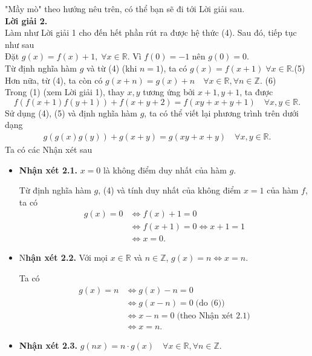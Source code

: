 \begin{bt}
{		"Mầy mò" theo hướng nêu trên, có thể bạn sẽ đi tới Lời giải sau.\\		
		\textbf{Lời giải 2.}\\
		Làm như Lời giải 1 cho đến hết phần rút ra được hệ thức (4). Sau đó, tiếp tục như sau\\
		Đặt $g(x)=f(x)+1, \; \forall x \in \mathbb{R}$. Vì $f(0)=-1$ nên $g(0)=0$.\\
		Từ định nghĩa hàm $g$ và từ (4) (khi $n=1$), ta có $g(x)=f(x+1)\;\forall x \in \mathbb{R}.$\hfill (5)\\
		Hơn nữa, từ (4), ta còn có $g(x+n)=g(x)+n \quad \forall x \in \mathbb{R},  \forall n \in \mathbb{Z}$. \hfill (6)\\
		Trong (1) (xem Lời giải 1), thay $x,y$ tương ứng bởi $x+1, y+1$, ta được
		$$f\left(f(x+1)f(y+1)\right)+f(x+y+2)=f(xy+x+y+1) \quad \forall x,y \in \mathbb{R}.$$
		Sử dụng (4), (5) và định nghĩa hàm $g$, ta có thể viết lại phương trình trên dưới dạng
		\begin{align*}
			g\left(g(x)g(y)\right)+g(x+y)=g(xy+x+y) \quad \forall x,y \in \mathbb{R}. \tag{7}
		\end{align*}
		Ta có các Nhận xét sau
		\begin{itemize}
			\item \textbf{Nhận xét 2.1.} $x=0$ là không điểm duy nhất của hàm $g$.
			\begin{cm}
				Từ định nghĩa hàm $g$, (4) và tính duy nhất của không điểm $x=1$ của hàm $f$, ta có
				\begin{align*}
					g(x)=0& \Leftrightarrow f(x)+1=0\\ 
					& \Leftrightarrow f(x+1)=0 \Leftrightarrow x+1=1\\
					&\Leftrightarrow x=0.
				\end{align*}
			\end{cm}
			\item N\textbf{hận xét 2.2.} Với mọi $x \in \mathbb{R}$ và $n \in \mathbb{Z}$, $g(x)=n \Leftrightarrow x=n$.
			\begin{cm}
				Ta có
				\begin{align*}
					g(x)=n& \Leftrightarrow g(x)-n=0\\ 
					&\Leftrightarrow g(x-n)=0 \;\text{(do (6))}\\
					&\Leftrightarrow x-n=0 \;\text{(theo Nhận xét 2.1)}\\
					&\Leftrightarrow x=n.
				\end{align*}
			\end{cm}
			\item \textbf{Nhận xét 2.3.} $g(nx)=n \cdot g(x) \quad \forall x \in \mathbb{R},  \forall n \in \mathbb{Z}.$

\end{itemize}}
\end{bt}
